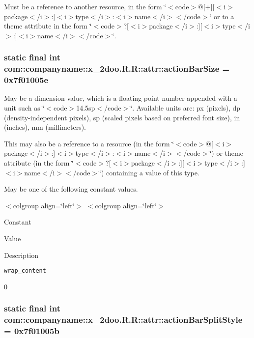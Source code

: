 Must be a reference to another resource, in the form \char`\"{}$<$code$>$@\mbox{[}+\mbox{]}\mbox{[}$<$i$>$package$<$/i$>$:\mbox{]}$<$i$>$type$<$/i$>$:$<$i$>$name$<$/i$>$$<$/code$>$\char`\"{} or to a theme attribute in the form \char`\"{}$<$code$>$?\mbox{[}$<$i$>$package$<$/i$>$:\mbox{]}\mbox{[}$<$i$>$type$<$/i$>$:\mbox{]}$<$i$>$name$<$/i$>$$<$/code$>$\char`\"{}. \hypertarget{classcom_1_1companyname_1_1x__2doo_1_1_r_1_1attr_c1625acac5fe34a8dac7bf00850eea71}{
\subsubsection[{actionBarSize}]{\setlength{\rightskip}{0pt plus 5cm}static final int com::companyname::x\_\-2doo.R.R::attr::actionBarSize = 0x7f01005e}}
\label{classcom_1_1companyname_1_1x__2doo_1_1_r_1_1attr_c1625acac5fe34a8dac7bf00850eea71}


May be a dimension value, which is a floating point number appended with a unit such as \char`\"{}$<$code$>$14.5sp$<$/code$>$\char`\"{}. Available units are: px (pixels), dp (density-independent pixels), sp (scaled pixels based on preferred font size), in (inches), mm (millimeters). 

This may also be a reference to a resource (in the form \char`\"{}$<$code$>$@\mbox{[}$<$i$>$package$<$/i$>$:\mbox{]}$<$i$>$type$<$/i$>$:$<$i$>$name$<$/i$>$$<$/code$>$\char`\"{}) or theme attribute (in the form \char`\"{}$<$code$>$?\mbox{[}$<$i$>$package$<$/i$>$:\mbox{]}\mbox{[}$<$i$>$type$<$/i$>$:\mbox{]}$<$i$>$name$<$/i$>$$<$/code$>$\char`\"{}) containing a value of this type. 

May be one of the following constant values. \begin{TabularC}{0}
\hline
\end{TabularC}
$<$colgroup align=\char`\"{}left\char`\"{}$>$ $<$colgroup align=\char`\"{}left\char`\"{}$>$ 

Constant

Value

Description 

{\tt wrap\_\-content}

0\hypertarget{classcom_1_1companyname_1_1x__2doo_1_1_r_1_1attr_ac78bb4aaa982eb4450169fbade228cd}{
\subsubsection[{actionBarSplitStyle}]{\setlength{\rightskip}{0pt plus 5cm}static final int com::companyname::x\_\-2doo.R.R::attr::actionBarSplitStyle = 0x7f01005b}}
\label{classcom_1_1companyname_1_1x__2doo_1_1_r_1_1attr_ac78bb4aaa982eb4450169fbade228cd}


